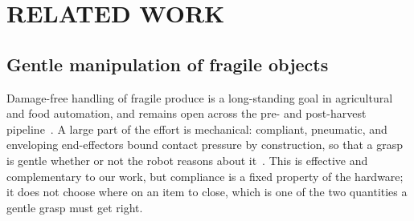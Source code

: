 %
%
%
\section{RELATED WORK}
\label{sec:related}

\subsection{Gentle manipulation of fragile objects}
Damage-free handling of fragile produce is a long-standing goal in agricultural and food
automation, and remains open across the pre- and post-harvest
pipeline~\cite{wang2025damageless}. A large part of the effort is mechanical: compliant,
pneumatic, and enveloping end-effectors bound contact pressure by construction, so that a
grasp is gentle whether or not the robot reasons about
it~\cite{wang2024softgripper,zhu2025deformable}. This is effective and complementary to our
work, but compliance is a fixed property of the hardware; it does not choose where on an item
to close, which is one of the two quantities a gentle grasp must get right.

